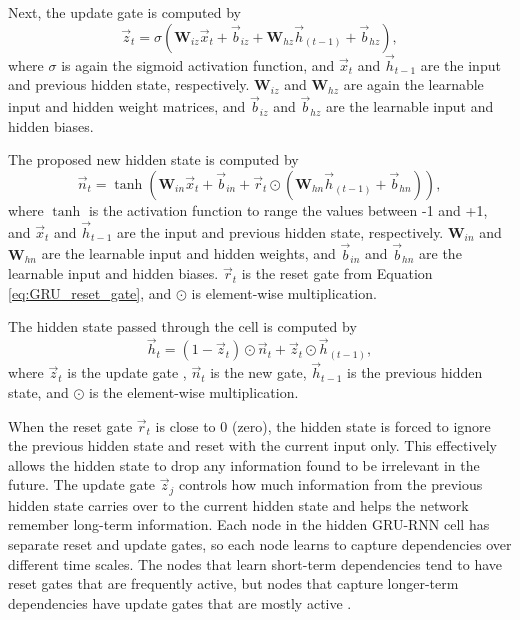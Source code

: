 Next, the update gate is computed by
\begin{equation} \label{eq:GRU_update_gate}
	\vec{z}_{t} = \sigma\left(\textbf{W}_{iz} \vec{x}_{t} + \vec{b}_{iz} + \textbf{W}_{hz} \vec{h}_{\left(t-1\right)} + \vec{b}_{hz}\right),
\end{equation}
where $\sigma$ is again the sigmoid activation function, and $\vec{x}_{t}$ and $\vec{h}_{t-1}$ are the input and previous hidden state, respectively. $\textbf{W}_{iz}$ and $\textbf{W}_{hz}$ are again the learnable input and hidden weight matrices, and $\vec{b}_{iz}$ and $\vec{b}_{hz}$ are the learnable input and hidden biases.

The proposed new hidden state is computed by
\begin{equation} \label{eq:GRU_new_gate}
		\vec{n}_{t} = \tanh\left(\textbf{W}_{in} \vec{x}_{t} + \vec{b}_{in} + \vec{r}_{t} \odot \left(\textbf{W}_{hn} \vec{h}_{\left(t-1\right)} + \vec{b}_{hn}\right)\right),
\end{equation}
where $\tanh$ is the activation function to range the values between -1 and +1, and $\vec{x}_{t}$ and $\vec{h}_{t-1}$ are the input and previous hidden state, respectively. $\textbf{W}_{in}$ and $\textbf{W}_{hn}$ are the learnable input and hidden weights, and $\vec{b}_{in}$ and $\vec{b}_{hn}$ are the learnable input and hidden biases. $\vec{r}_{t}$ is the reset gate from Equation \ref{eq:GRU_reset_gate}, and $\odot$ is element-wise multiplication.

The hidden state passed through the cell is computed by
\begin{equation} \label{eq:GRU_new_hidden_state}
	\vec{h}_{t} = \left(1 - \vec{z}_{t}\right) \odot \vec{n}_{t} + \vec{z}_{t} \odot \vec{h}_{\left(t-1\right)},
\end{equation}
where $\vec{z}_{t}$ is the update gate , $\vec{n}_{t}$ is the new gate, $\vec{h}_{t-1}$ is the previous hidden state, and $\odot$ is the element-wise multiplication.

When the reset gate $\vec{r}_{t}$ is close to 0 (zero), the hidden state is forced to ignore the previous hidden state and reset with the current input only. This effectively allows the hidden state to drop any information found to be irrelevant in the future. The update gate $\vec{z}_{j}$ controls how much information from the previous hidden state carries over to the current hidden state and helps the network remember long-term information. Each node in the hidden \ac{GRU-RNN} cell has separate reset and update gates, so each node learns to capture dependencies over different time scales. The nodes that learn short-term dependencies tend to have reset gates that are frequently active, but nodes that capture longer-term dependencies have update gates that are mostly active \cite{GRU_original}.

